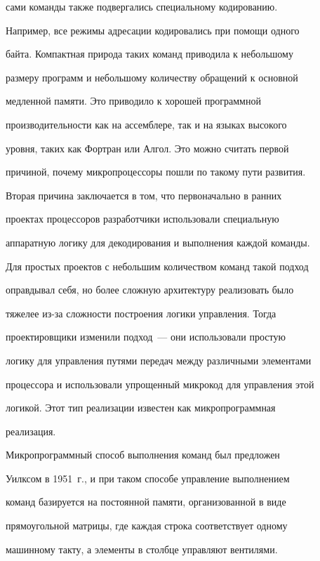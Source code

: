 сами команды также подвергались специальному кодированию. 


Например, все режимы адресации кодировались при помощи одного 


байта. Компактная природа таких команд приводила к небольшому 


размеру программ и небольшому количеству обращений к основной 


медленной памяти. Это приводило к хорошей программной 


производительности как на ассемблере, так и на языках высокого 


уровня, таких как Фортран или Алгол. Это можно считать первой 


причиной, почему микропроцессоры пошли по такому пути развития.





Вторая причина заключается в том, что  первоначально в ранних 


проектах процессоров разработчики использовали специальную 


аппаратную логику для декодирования и выполнения каждой команды. 


Для простых проектов с небольшим количеством команд такой подход 


оправдывал себя, но более сложную архитектуру реализовать было 


тяжелее из-за сложности построения логики управ\-ле\-ния. Тогда 


проектировщики изменили подход~--- они использовали прос\-тую 


логику для  управ\-ле\-ния путями передач между различными элементами 


процессора и использовали упрощенный микрокод для управ\-ле\-ния  этой 


логикой. Этот тип реализации известен как микропрограммная 


реализация.





Микропрограммный способ выполнения команд был предложен 


Уилксом в 1951~г., и при таком способе управ\-ле\-ние выполнением 


команд базируется на постоянной памяти, организованной в виде 


прямоугольной матрицы, где каждая строка соответствует одному 


машинному такту, а элементы в столбце управ\-ля\-ют вентилями. 





